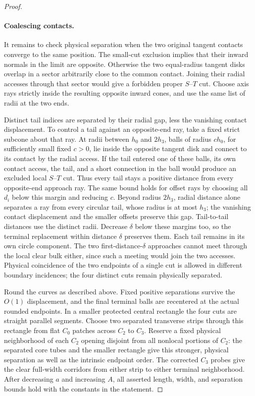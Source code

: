\begin{proof}


\paragraph{Coalescing contacts.}
It remains to check physical separation when the two original tangent
contacts converge to the same position.  The small-cut exclusion implies
that their inward normals in the limit are opposite.  Otherwise the
two equal-radius tangent disks overlap in a sector arbitrarily close
to the common contact.  Joining their radial accesses through that
sector would give a forbidden proper $S$--$T$ cut.  Choose axis rays
strictly inside the resulting opposite inward cones, and use the same
list of radii at the two ends.

Distinct tail indices are separated by their radial gap, less the
vanishing contact displacement.  To control a tail against an
opposite-end ray, take a fixed strict subcone about that ray.  At
radii between $h_0$ and $2h_3$, balls of radius $c h_0$, for sufficiently
small fixed $c>0$, lie inside the opposite tangent disk and connect
to its contact by the radial access.  If the tail entered one of these
balls, its own contact access, the tail, and a short connection in the
ball would produce an excluded local $S$--$T$ cut.  Thus every tail
stays a positive distance from every opposite-end approach ray.  The
same bound holds for offset rays by choosing all $d_i$ below this
margin and reducing $c$.  Beyond radius $2h_3$, radial distance alone
separates a ray from every circular tail, whose radius is at most $h_3$; the
vanishing contact displacement and the smaller offsets preserve this
gap.  Tail-to-tail distances use the distinct
radii.  Decrease $\delta$ below these margins too, so the terminal
replacement within distance $\delta$ preserves them.  Each tail
remains in its own circle component.  The two
first-distance-$\delta$ approaches cannot meet through the local
clear bulk either, since such a meeting would join the two accesses.
Physical coincidence of the two endpoints of a single cut is allowed
in different boundary incidences; the four distinct cuts remain
physically separated.

Round the curves as described above.  Fixed positive separations
survive the $O(1)$ displacement, and the final terminal balls are
recentered at the actual rounded endpoints.  In a smaller protected
central rectangle the four cuts are straight parallel segments.
Choose two separated transverse strips through this rectangle from
flat $C_0$ patches across $C_2$ to $C_3$.  Reserve a fixed physical
neighborhood of each $C_2$ opening disjoint from all nonlocal portions
of $C_2$: the separated core tubes and the smaller rectangle give
this stronger, physical separation as well as the intrinsic endpoint
order.  The corrected $C_3$ probes give the clear full-width corridors
from either strip to either terminal neighborhood.  After decreasing
$a$ and increasing $A$, all asserted length, width, and separation
bounds hold with the constants in the statement.


\end{proof}

